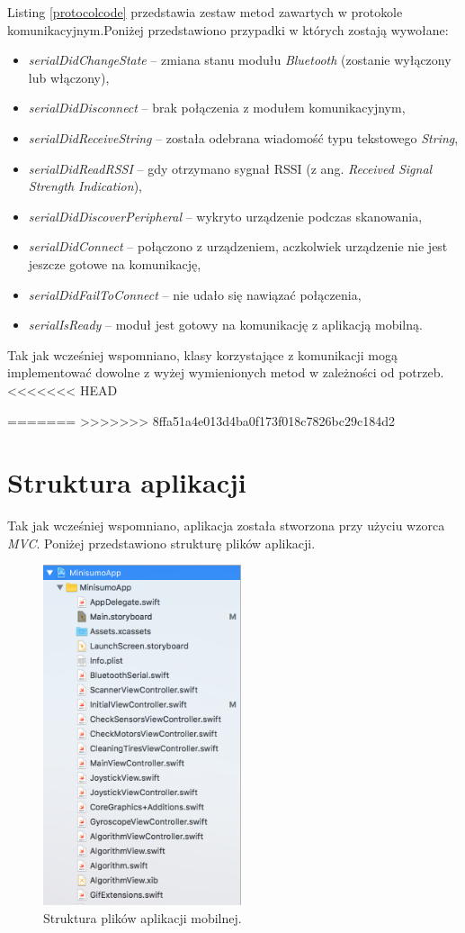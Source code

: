 Listing \ref{protocolcode} przedstawia zestaw metod zawartych w protokole komunikacyjnym.Poniżej przedstawiono przypadki w których zostają wywołane:

\begin{itemize}
\item \textit{serialDidChangeState} –  zmiana stanu modułu \textit{Bluetooth} (zostanie wyłączony lub włączony),
\item \textit{serialDidDisconnect} –  brak połączenia z modułem komunikacyjnym,
\item \textit{serialDidReceiveString} – została odebrana wiadomość typu tekstowego \textit{String},
\item \textit{serialDidReadRSSI} – gdy otrzymano sygnał RSSI (z ang. \textit{Received Signal Strength Indication}),
\item \textit{serialDidDiscoverPeripheral} – wykryto urządzenie podczas skanowania,
\item \textit{serialDidConnect} – połączono z urządzeniem, aczkolwiek urządzenie nie jest jeszcze gotowe na komunikację,
\item \textit{serialDidFailToConnect} – nie udało się nawiązać połączenia,
\item \textit{serialIsReady} – moduł jest gotowy na komunikację z aplikacją mobilną.
\end{itemize}

Tak jak wcześniej wspomniano, klasy korzystające z komunikacji mogą implementować dowolne z wyżej wymienionych metod w zależności od potrzeb.
<<<<<<< HEAD

\newpage
=======
>>>>>>> 8ffa51a4e013d4ba0f173f018c7826bc29c184d2

\section{Struktura aplikacji}
Tak jak wcześniej wspomniano, aplikacja została stworzona przy użyciu wzorca \textit{MVC}. Poniżej przedstawiono strukturę plików aplikacji.

\begin{figure}[H]
	\centering
		\includegraphics[width=0.75\linewidth, height=10cm, keepaspectratio]{pic05/structure.png}
	\caption{Struktura plików aplikacji mobilnej.}
	\label{fig:structure}	
\end{figure}

